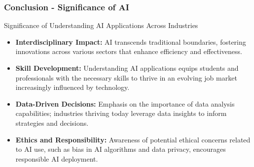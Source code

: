 \documentclass{beamer}
\begin{document}
\begin{frame}[fragile]
    \frametitle{Conclusion - Significance of AI}
    \begin{block}{Significance of Understanding AI Applications Across Industries}
        \begin{itemize}
            \item \textbf{Interdisciplinary Impact:} AI transcends traditional boundaries, fostering innovations across various sectors that enhance efficiency and effectiveness.
            \item \textbf{Skill Development:} Understanding AI applications equips students and professionals with the necessary skills to thrive in an evolving job market increasingly influenced by technology.
            \item \textbf{Data-Driven Decisions:} Emphasis on the importance of data analysis capabilities; industries thriving today leverage data insights to inform strategies and decisions.
            \item \textbf{Ethics and Responsibility:} Awareness of potential ethical concerns related to AI use, such as bias in AI algorithms and data privacy, encourages responsible AI deployment.
        \end{itemize}
    \end{block}
\end{frame}
\end{document}

